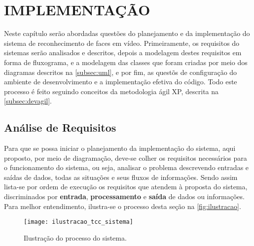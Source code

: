 
\chapter{IMPLEMENTAÇÃO}\label{ch:implementacao}

Neste capítulo serão abordadas questões do planejamento e da implementação do sistema de reconhecimento de faces em vídeo. Primeiramente, os requisitos do sistemas serão analisados e descritos, depois a modelagem destes requisitos em forma de fluxograma, e a modelagem das classes que foram criadas por meio dos diagramas descritos na \autoref{subsec:uml}, e por fim, as questõs de configuração do ambiente de desenvolvimento e a implementação efetiva do código. Todo este processo é feito seguindo conceitos da metodologia ágil XP, descrita na \autoref{subsec:devagil}.

\section{Análise de Requisitos}\label{sec:analiserec}
Para que se possa iniciar o planejamento da implementação do sistema, aqui proposto, por meio de diagramação, deve-se colher os requisitos necessários para o funcionamento do sistema, ou seja, analisar o problema descrevendo entradas e saídas de dados, todas as situações e seus fluxos de informações. Sendo assim lista-se por ordem de execução os requisitos que atendem à proposta do sistema, discriminados por \textbf{entrada}, \textbf{processamento} e \textbf{saída} de dados ou informações. Para melhor entendimento, ilustra-se o processo desta seção na \autoref{fig:ilustracao}.

\begin{figure}[h]
	\centering
	\texttt{[image: ilustracao\_tcc\_sistema]}
	\caption{Ilustração do processo do sistema.}
	\label{fig:ilustracao}
\end{figure}

